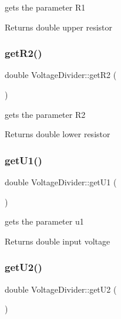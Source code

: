 gets the parameter R1 

\begin{DoxyReturn}{Returns}
double upper resistor 
\end{DoxyReturn}
\mbox{\label{classVoltageDivider_aa83138c075ea0b37a20d65e4d7cc068b}} 
\subsubsection{\texorpdfstring{get\+R2()}{getR2()}}
{\footnotesize\ttfamily double Voltage\+Divider\+::get\+R2 (\begin{DoxyParamCaption}{ }\end{DoxyParamCaption})}



gets the parameter R2 

\begin{DoxyReturn}{Returns}
double lower resistor 
\end{DoxyReturn}
\mbox{\label{classVoltageDivider_a36ab249dd0f1e5cb7b055affd249af6c}} 
\subsubsection{\texorpdfstring{get\+U1()}{getU1()}}
{\footnotesize\ttfamily double Voltage\+Divider\+::get\+U1 (\begin{DoxyParamCaption}{ }\end{DoxyParamCaption})}



gets the parameter u1 

\begin{DoxyReturn}{Returns}
double input voltage 
\end{DoxyReturn}
\mbox{\label{classVoltageDivider_aee0957fabf473c72488e3d5fa7316bcd}} 
\subsubsection{\texorpdfstring{get\+U2()}{getU2()}}
{\footnotesize\ttfamily double Voltage\+Divider\+::get\+U2 (\begin{DoxyParamCaption}{ }\end{DoxyParamCaption})}



